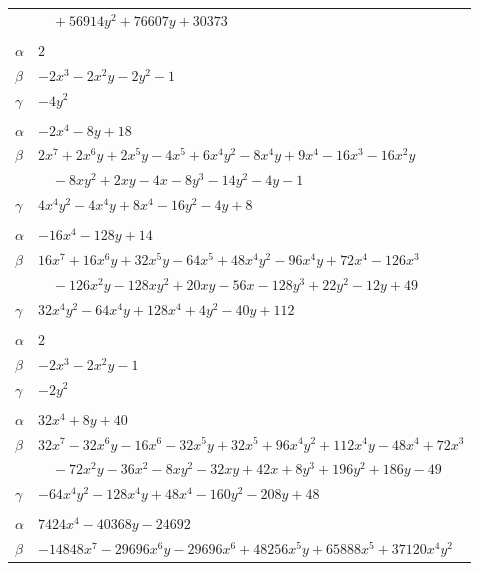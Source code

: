 \documentclass[11pt]{article}
\begin{document}
\begin{longtable}{@{}ll@{}}
 & $\quad +56914y^{2}+76607y+30373$\\
\addlinespace[3pt]
\multicolumn{2}{@{}l}{$\{i,j\}=\{4,8\}$, $k_{ij}=2^{2}$}\\
$\alpha$ & $2$\\
$\beta$ & $-2x^{3}-2x^{2}y-2y^{2}-1$\\
$\gamma$ & $-4y^{2}$\\
\addlinespace[3pt]
\multicolumn{2}{@{}l}{$\{i,j\}=\{4,18\}$, $k_{ij}=2^{2}\cdot 3^{2}$}\\
$\alpha$ & $-2x^{4}-8y+18$\\
$\beta$ & $2x^{7}+2x^{6}y+2x^{5}y-4x^{5}+6x^{4}y^{2}-8x^{4}y+9x^{4}-16x^{3}-16x^{2}y$\\
 & $\quad -8xy^{2}+2xy-4x-8y^{3}-14y^{2}-4y-1$\\
$\gamma$ & $4x^{4}y^{2}-4x^{4}y+8x^{4}-16y^{2}-4y+8$\\
\addlinespace[3pt]
\multicolumn{2}{@{}l}{$\{i,j\}=\{4,20\}$, $k_{ij}=2^{2}\cdot 3^{2}\cdot 7$}\\
$\alpha$ & $-16x^{4}-128y+14$\\
$\beta$ & $16x^{7}+16x^{6}y+32x^{5}y-64x^{5}+48x^{4}y^{2}-96x^{4}y+72x^{4}-126x^{3}$\\
 & $\quad -126x^{2}y-128xy^{2}+20xy-56x-128y^{3}+22y^{2}-12y+49$\\
$\gamma$ & $32x^{4}y^{2}-64x^{4}y+128x^{4}+4y^{2}-40y+112$\\
\addlinespace[3pt]
\multicolumn{2}{@{}l}{$\{i,j\}=\{4,29\}$, $k_{ij}=2^{2}$}\\
$\alpha$ & $2$\\
$\beta$ & $-2x^{3}-2x^{2}y-1$\\
$\gamma$ & $-2y^{2}$\\
\addlinespace[3pt]
\multicolumn{2}{@{}l}{$\{i,j\}=\{5,15\}$, $k_{ij}=3^{4}$}\\
$\alpha$ & $32x^{4}+8y+40$\\
$\beta$ & $32x^{7}-32x^{6}y-16x^{6}-32x^{5}y+32x^{5}+96x^{4}y^{2}+112x^{4}y-48x^{4}+72x^{3}$\\
 & $\quad -72x^{2}y-36x^{2}-8xy^{2}-32xy+42x+8y^{3}+196y^{2}+186y-49$\\
$\gamma$ & $-64x^{4}y^{2}-128x^{4}y+48x^{4}-160y^{2}-208y+48$\\
\addlinespace[3pt]
\multicolumn{2}{@{}l}{$\{i,j\}=\{6,25\}$, $k_{ij}=3^{7}\cdot 7$}\\
$\alpha$ & $7424x^{4}-40368y-24692$\\
$\beta$ & $-14848x^{7}-29696x^{6}y-29696x^{6}+48256x^{5}y+65888x^{5}+37120x^{4}y^{2}$\\

\end{longtable}
\end{document}

